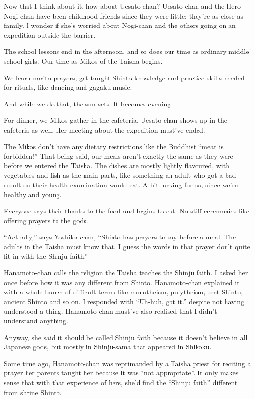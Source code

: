 Now that I think about it, how about Uesato-chan? Uesato-chan and the Hero Nogi-chan have been childhood friends since they were little; they're as close as family. I wonder if she's worried about Nogi-chan and the others going on an expedition outside the barrier.

The school lessons end in the afternoon, and so does our time as ordinary middle school girls. Our time as Mikos of the Taisha begins.

We learn norito prayers, get taught Shinto knowledge and practice skills needed for rituals, like dancing and gagaku music.

And while we do that, the sun sets. It becomes evening.

For dinner, we Mikos gather in the cafeteria. Uesato-chan shows up in the cafeteria as well. Her meeting about the expedition must've ended.

The Mikos don't have any dietary restrictions like the Buddhist ``meat is forbidden!'' That being said, our meals aren't exactly the same as they were before we entered the Taisha. The dishes are mostly lightly flavoured, with vegetables and fish as the main parts, like something an adult who got a bad result on their health examination would eat. A bit lacking for us, since we're healthy and young.

Everyone says their thanks to the food and begins to eat. No stiff ceremonies like offering prayers to the gods.

``Actually,'' says Yoshika-chan, ``Shinto has prayers to say before a meal. The adults in the Taisha must know that. I guess the words in that prayer don't quite fit in with the Shinju faith.''

Hanamoto-chan calls the religion the Taisha teaches the Shinju faith. I asked her once before how it was any different from Shinto. Hanamoto-chan explained it with a whole bunch of difficult terms like monotheism, polytheism, sect Shinto, ancient Shinto and so on. I responded with ``Uh-huh, got it.'' despite not having understood a thing. Hanamoto-chan must've also realised that I didn't understand anything.

Anyway, she said it should be called Shinju faith because it doesn't believe in all Japanese gods, but mostly in Shinju-sama that appeared in Shikoku.

Some time ago, Hanamoto-chan was reprimanded by a Taisha priest for reciting a prayer her parents taught her because it was ``not appropriate''. It only makes sense that with that experience of hers, she'd find the ``Shinju faith'' different from shrine Shinto.

